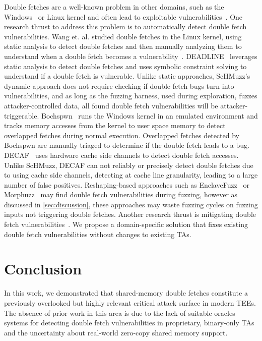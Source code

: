 \documentclass[conference]{IEEEtran} %
\newcommand{\sysname}{ScHMuzz\xspace}
\providecommand{\DIFaddtex}[1]{{\protect\color{blue} \sf #1}} %
\providecommand{\DIFdeltex}[1]{{\protect\color{red} \scriptsize #1}} %
\providecommand{\DIFaddbegin}{} %
\providecommand{\DIFaddend}{} %
\providecommand{\DIFdelbegin}{} %
\providecommand{\DIFdelend}{} %
\providecommand{\DIFadd}[1]{\texorpdfstring{\DIFaddtex{#1}}{#1}} %
\providecommand{\DIFdel}[1]{\texorpdfstring{\DIFdeltex{#1}}{}} %
\begin{document}
Double fetches are a well-known problem in other domains, such as 
the Windows~\cite{ms2008} or Linux kernel\cite{wang2017double} and often lead 
to exploitable vulnerabilities~\cite{warpattack,bochspwn}.
One research thrust to address this problem is to automatically detect double 
fetch vulnerabilities. Wang et. al. studied double fetches in the Linux kernel, 
using static analysis to detect double fetches and then manually analyzing them 
to understand when a double fetch becomes a vulnerability~\cite{wang2017double}. 
DEADLINE~\cite{deadline} leverages static analysis to detect double fetches and 
uses symbolic constraint solving to understand if a double fetch is vulnerable. 
Unlike static approaches, \sysname's 
dynamic approach does not require checking if double fetch bugs turn into 
vulnerabilities, and as long as the fuzzing harness, used 
during exploration, fuzzes attacker-controlled data, all found double fetch 
vulnerabilities will be attacker-triggerable. Bochspwn~\cite{bochspwn} runs 
the Windows kernel in an emulated environment and tracks memory accesses from the 
kernel to user space memory to detect overlapped fetches during normal execution. 
Overlapped fetches detected by Bochspwn are manually triaged to determine if the double 
fetch leads to a bug. DECAF~\cite{decaf} uses hardware cache side 
channels to detect double fetch accesses. Unlike \sysname, DECAF can not reliably 
or precisely detect double fetches due to using cache side channels, detecting at 
cache line granularity, leading to a large number of false positives. 
Reshaping-based approaches such as EnclaveFuzz~\cite{chen2024enclavefuzz} or 
Morphuzz~\cite{morphuzz} may find double fetch vulnerabilities during fuzzing, however 
as discussed in \autoref{sec:discussion}, these approaches may waste fuzzing cycles on 
fuzzing inputs not triggering double fetches. 
Another research thrust is mitigating double fetch vulnerabilities~\cite{midas,safefetch,decaf,dftinker}.
We propose a domain-specific solution that fixes existing double fetch vulnerabilities 
without changes to existing TAs.

\section{Conclusion}\label{sec:conclusion}

In this work, we demonstrated that shared-memory double fetches constitute a 
previously overlooked but highly \DIFdelbegin \DIFdel{relevant }\DIFdelend \DIFaddbegin \DIFadd{critical }\DIFaddend attack surface in modern TEEs. 
The absence of prior work \DIFdelbegin \DIFdel{in this area }\DIFdelend is due to the lack of suitable \DIFdelbegin \DIFdel{oracles }\DIFdelend \DIFaddbegin \DIFadd{systems }\DIFaddend for detecting double fetch 
vulnerabilities in proprietary, binary-only TAs and the uncertainty about real-world 
zero-copy shared memory support.
\end{document}
